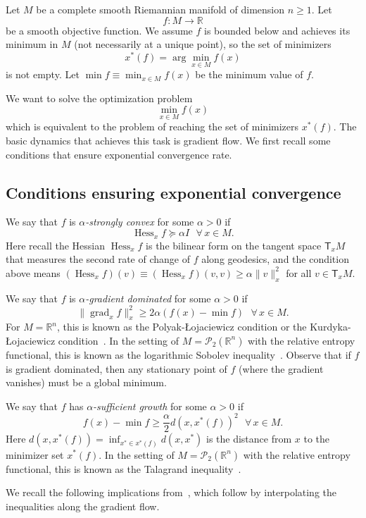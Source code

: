 \documentclass[final,12pt]{colt2018}
\newcommand{\R}{\mathbb{R}}
\DeclareMathOperator{\grad}{grad}
\DeclareMathOperator{\Hess}{Hess}
\newcommand{\T}{\mathsf{T}}
\newcommand{\M}{{M}}
\renewcommand{\P}{\mathcal{P}}
\begin{document}
Let $\M$ be a complete smooth Riemannian manifold of dimension $n \ge 1$.
Let
$$f \colon \M \to \R$$
be a smooth objective function.
We assume $f$ is bounded below and achieves its minimum in $\M$ (not necessarily at a unique point), so the set of minimizers
$$x^\ast(f) = \arg\min_{x \in \M} f(x)$$
is not empty.
Let $\min f \equiv \min_{x \in \M} f(x)$ be the minimum value of $f$.

We want to solve the optimization problem
$$\min_{x \in \M} f(x)$$
which is equivalent to the problem of reaching the set of minimizers $x^\ast(f)$.
The basic dynamics that achieves this task is gradient flow.
We first recall some conditions that ensure exponential convergence rate.


\subsection{Conditions ensuring exponential convergence}
\label{Sec:CondExp}

We say that $f$ is {\em $\alpha$-strongly convex} for some $\alpha > 0$ if 
$$\Hess_x f \succeq \alpha I~~~\forall\, x \in \M.$$
Here recall the Hessian $\Hess_x f$ is the bilinear form on the tangent space $\T_x\M$ that measures the second rate of change of $f$ along geodesics, and the condition above means $(\Hess_x f)(v) \equiv (\Hess_x f)(v,v) \ge \alpha \|v\|_x^2$ for all $v \in \T_x\M$.

We say that $f$ is {\em $\alpha$-gradient dominated} for some $\alpha > 0$ if
$$\|\grad_x f\|^2_x \ge 2\alpha (f(x)-\min f)~~~\forall\, x \in \M.$$
For $\M = \R^n$, this is known as the Polyak-\L{}ojaciewicz condition or the Kurdyka-\L{}ojaciewicz condition~\cite[]{P63,L63}.
In the setting of $\M = \P_2(\R^n)$ with the relative entropy functional, this is known as the logarithmic Sobolev inequality~\cite[]{OV00}.
Observe that if $f$ is gradient dominated, then any stationary point of $f$ (where the gradient vanishes) must be a global minimum.

We say that $f$ has {\em $\alpha$-sufficient growth} for some $\alpha > 0$ if
$$f(x)-\min f \ge \frac{\alpha}{2} d(x,x^\ast(f))^2~~~\forall\, x \in \M.$$ 
Here $d(x,x^\ast(f)) = \inf_{x^\ast \in x^\ast(f)} d(x,x^\ast)$ is the distance from $x$ to the minimizer set $x^\ast(f)$.
In the setting of $\M = \P_2(\R^n)$ with the relative entropy functional, this is known as the Talagrand inequality~\cite[]{OV00}.

We recall the following implications from~\cite[Propositions~1' \& 2']{OV00}, 
which follow by interpolating the inequalities along the gradient flow.
\end{document}
